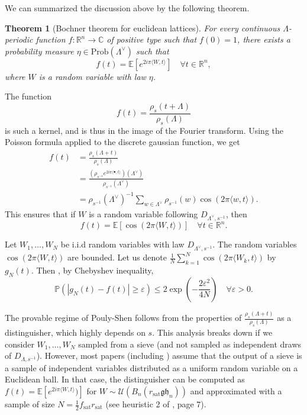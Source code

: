 \documentclass{article}
\newtheorem{theorem}{Theorem}
\begin{document}
We can summarized the discussion above by the following theorem.

\begin{theorem}[Bochner theorem for euclidean lattices]
For every continuous $\Lambda$-periodic function $f : \mathbb R^n \rightarrow \mathbb C$ of positive type such that $f(0) = 1$, there exists a probability measure $\eta\in \text{Prob} (\Lambda^\vee)$ such that 
\[f(t) =\mathbb E[e^{2i\pi \langle W , t\rangle } ]\quad\forall t\in \mathbb R^n ,\]
where $W$ is a random variable with law $\eta$.
\end{theorem}

The function 
\[f(t) = \frac{\rho_s(t+\Lambda)}{\rho_s(\Lambda)}\]
is such a kernel, and is thus in the image of the Fourier transform. Using the Poisson formula applied to the discrete gaussian function, we get 
\[\begin{split} 
f(t) & = \frac{ \rho_s (\Lambda + t)}{\rho_s (\Lambda )} \\ 
	& = \frac{ ( \rho_{s^{-1}} e^{2i\pi \langle \bullet , t\rangle }) (\Lambda^\vee) }{ \rho_{s^{-1}}(\Lambda^\vee)} \\
	& = \rho_{s^{-1}}(\Lambda^\vee)^{-1}\sum_{w\in \Lambda^\vee} \rho_{s^{-1}}(w) \cos (2\pi \langle w,t\rangle ) .
\end{split}\]
This ensures that if $W$ is a random variable following $D_{\Lambda^\vee, s^{-1}}$, then 
\[f(t) = \mathbb E[\cos (2\pi \langle W , t \rangle ) ] \quad \forall t\in \mathbb R^n.\] 

Let $W_1,\ldots , W_N$ be i.i.d random variables with law $D_{\Lambda^\vee, s^{-1}}$. The random variables $\cos (2\pi \langle W , t \rangle ) $ are bounded. 
Let us denote $\frac{1}{N}\sum_{k=1}^N \cos (2\pi \langle W_k , t \rangle )$ by $g_N(t)$. Then , by Chebyshev inequality,
\[\mathbb P( |g_N(t) - f(t) |\geq \varepsilon ) \leq  2 \exp( - \frac{2\varepsilon^2}{4N}) \quad \forall \varepsilon >0.\]

The provable regime of Pouly-Shen follows from the properties of $\frac{ \rho_s (\Lambda + t)}{\rho_s (\Lambda )}$ as a distinguisher, which highly depends on $s$. This analysis breaks down if we consider $W_1,\ldots , W_N$ sampled from a sieve (and not sampled as independent draws of $D_{\Lambda,s^{-1}}$). However, most papers (including \cite{ducas2023accurate}) assume that the output of a sieve is a sample of independent variables distributed as a uniform random variable on a Euclidean ball. In that case, the distinguisher can be computed as $f(t) = \mathbb E[e^{2i\pi\langle W , t \rangle} )]$ for $W\sim \mathcal U(B_n(r_{\text{sat}} \mathfrak{gh}_n))$ and approximated with a sample of size $N = \frac{1}{2}f_{\text{sat}}r_{\text{sat}} $ (see heuristic 2 of \cite{ducas2023accurate}, page 7).    
\end{document}

